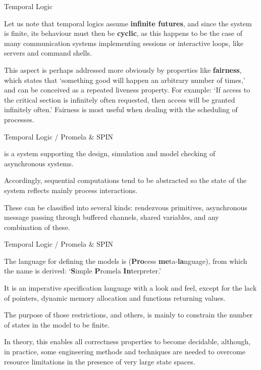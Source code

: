 \documentclass[compress,dvips,xcolor={dvipsnames},t]{beamer}
\begin{document}
%
\begin{frame}{Temporal Logic}

  Let us note that temporal logics assume \textbf{infinite futures},
  and since the system is finite, its behaviour must then be
  \textbf{cyclic}, as this happens to be the case of many
  communication systems implementing sessions or interactive loops,
  like servers and command shells.

  \bigskip

  This aspect is perhaps addressed more obviously by properties like
  \textbf{fairness}, which states that `something good will happen an
  arbitrary number of times,' and can be conceived as a repeated
  liveness property. For example: `If access to the critical section
  is infinitely often requested, then access will be granted
  infinitely often.' Fairness is most useful when dealing with the
  scheduling of processes.

\end{frame}

%
\begin{frame}{Temporal Logic / Promela \& SPIN}

\SPIN is a system supporting the design, simulation and model checking
of asynchronous systems.

\bigskip

Accordingly, sequential computations tend to be abstracted so the
state of the system reflects mainly process interactions.

\bigskip

These can be classified into several kinds: rendezvous primitives,
asynchronous message passing through buffered channels, shared
variables, and any combination of these.

\end{frame}

%
\begin{frame}{Temporal Logic / Promela \& SPIN}

The language for defining the models is \Promela (\textbf{Pro}cess
\textbf{me}ta\hyp{}\textbf{la}nguage), from which the name \SPIN is
derived: `\textbf{S}imple \textbf{P}romela \textbf{In}terpreter.'

\bigskip

It is an imperative specification language with a \Clang look and
feel, except for the lack of pointers, dynamic memory allocation and
functions returning values.

\bigskip

The purpose of those restrictions, and
others, is mainly to constrain the number of states in the model to be
finite.

\bigskip

In theory, this enables all correctness properties to become
decidable, although, in practice, some engineering methods and
techniques are needed to overcome resource limitations in the presence
of very large state spaces.

\end{frame}
\end{document}
